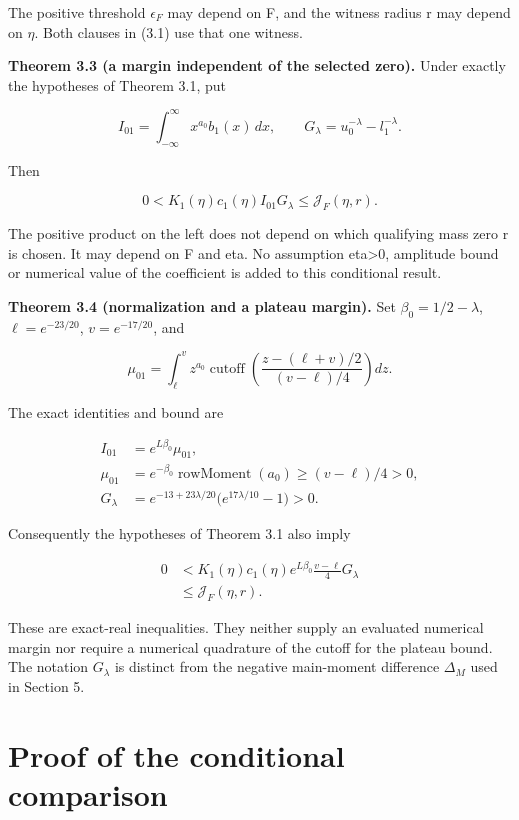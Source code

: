 \documentclass[11pt,a4paper]{article}
\begin{document}
The positive threshold \(\epsilon _F\) may depend on F, and the witness radius r may depend on \ensuremath{\eta}. Both clauses in (3.1) use that one witness.


\textbf{Theorem 3.3 (a margin independent of the selected zero).} Under exactly the
hypotheses of Theorem 3.1, put

\[
I_{01}=\int_{-\infty}^{\infty}x^{a_0}b_1(x)\,dx,\qquad
G_\lambda=u_0^{-\lambda}-l_1^{-\lambda}.
\]

Then

\[
0<K_1(\eta)c_1(\eta)I_{01}G_\lambda
\le\mathcal J_F(\eta,r). \tag{3.2}
\]

The positive product on the left does not depend on which qualifying mass zero
r is chosen. It may depend on F and eta. No assumption eta>0, amplitude bound
or numerical value of the coefficient is added to this conditional result.

\textbf{Theorem 3.4 (normalization and a plateau margin).} Set \(\beta_0=1/2-\lambda\), \(\ell=e^{-23/20}\), \(v=e^{-17/20}\), and

\[
\mu_{01}=\int_\ell^v z^{a_0}
  \operatorname{cutoff}\!\left(\frac{z-(\ell+v)/2}{(v-\ell)/4}\right)dz.
\]

The exact identities and bound are

\[
\begin{aligned}
I_{01}&=e^{L\beta_0}\mu_{01},\\
\mu_{01}&=e^{-\beta_0}\operatorname{rowMoment}(a_0)
                 \ge (v-\ell)/4>0,\\
G_\lambda&=e^{-13+23\lambda/20}\bigl(e^{17\lambda/10}-1\bigr)>0.
\end{aligned} \tag{3.3}
\]

Consequently the hypotheses of Theorem 3.1 also imply

\[
\begin{aligned}
0&<K_1(\eta)c_1(\eta)e^{L\beta_0}\frac{v-\ell}{4}G_\lambda\\
 &\le\mathcal J_F(\eta,r).
\end{aligned} \tag{3.4}
\]

These are exact-real inequalities. They neither supply an evaluated numerical
margin nor require a numerical quadrature of the cutoff for the plateau bound.
The notation \(G_\lambda\) is distinct from the negative main-moment difference \(\Delta_M\) used in Section 5.

\section{Proof of the conditional comparison}
\end{document}
